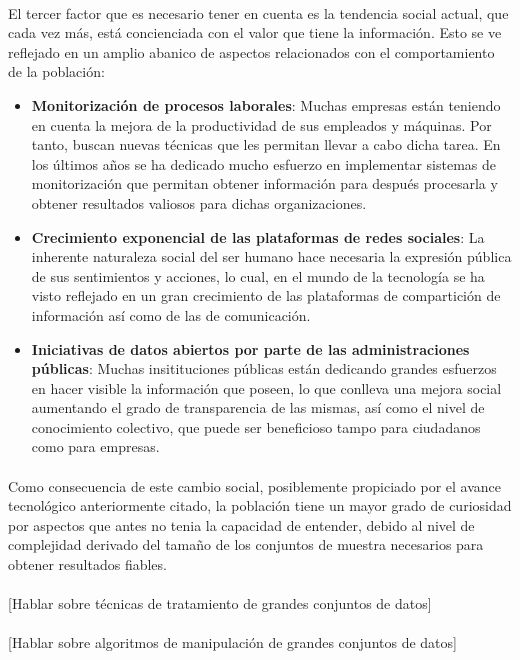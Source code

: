 \documentclass{subfiles}
\begin{document}
    \paragraph{}
    El tercer factor que es necesario tener en cuenta es la tendencia social actual, que cada vez más, está concienciada con el valor que tiene la información. Esto se ve reflejado en un amplio abanico de aspectos relacionados con el comportamiento de la población:

    \begin{itemize}

      \item \textbf{Monitorización de procesos laborales}: Muchas empresas están teniendo en cuenta la mejora de la productividad de sus empleados y máquinas. Por tanto, buscan nuevas técnicas que les permitan llevar a cabo dicha tarea. En los últimos años se ha dedicado mucho esfuerzo en implementar sistemas de monitorización que permitan obtener información para después procesarla y obtener resultados valiosos para dichas organizaciones.

      \item \textbf{Crecimiento exponencial de las plataformas de redes sociales}: La inherente naturaleza social del ser humano hace necesaria la expresión pública de sus sentimientos y acciones, lo cual, en el mundo de la tecnología se ha visto reflejado en un gran crecimiento de las plataformas de compartición de información así como de las de comunicación.

      \item \textbf{Iniciativas de datos abiertos por parte de las administraciones públicas}: Muchas insitituciones públicas están dedicando grandes esfuerzos en hacer visible la información que poseen, lo que conlleva una mejora social aumentando el grado de transparencia de las mismas, así como el nivel de conocimiento colectivo, que puede ser beneficioso tampo para ciudadanos como para empresas.

    \end{itemize}

    \paragraph{}
    Como consecuencia de este cambio social, posiblemente propiciado por el avance tecnológico anteriormente citado, la población tiene un mayor grado de curiosidad por aspectos que antes no tenia la capacidad de entender, debido al nivel de complejidad derivado del tamaño de los conjuntos de muestra necesarios para obtener resultados fiables.

  \paragraph{}
  [Hablar sobre técnicas de tratamiento de grandes conjuntos de datos]

  \paragraph{}
  [Hablar sobre algoritmos de manipulación de grandes conjuntos de datos]
\end{document}
